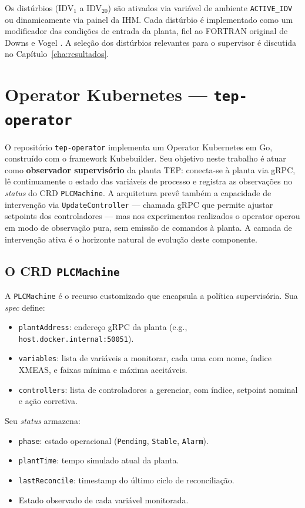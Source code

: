 Os distúrbios (IDV$_1$ a IDV$_{20}$) são ativados via variável de ambiente \texttt{ACTIVE\_IDV} ou dinamicamente via painel da IHM. Cada distúrbio é implementado como um modificador das condições de entrada da planta, fiel ao FORTRAN original de Downs e Vogel \cite{DOWNS1993}. A seleção dos distúrbios relevantes para o supervisor é discutida no Capítulo~\ref{cha:resultados}.

\section{Operator Kubernetes — \texttt{tep-operator}}
\label{sec:operator}

O repositório \texttt{tep-operator} implementa um Operator Kubernetes em Go, construído com o framework Kubebuilder. Seu objetivo neste trabalho é atuar como \textbf{observador supervisório} da planta TEP: conecta-se à planta via gRPC, lê continuamente o estado das variáveis de processo e registra as observações no \textit{status} do CRD \texttt{PLCMachine}. A arquitetura prevê também a capacidade de intervenção via \texttt{UpdateController} — chamada gRPC que permite ajustar setpoints dos controladores — mas nos experimentos realizados o operator operou em modo de observação pura, sem emissão de comandos à planta. A camada de intervenção ativa é o horizonte natural de evolução deste componente.

\subsection{O CRD \texttt{PLCMachine}}

A \texttt{PLCMachine} é o recurso customizado que encapsula a política supervisória. Sua \textit{spec} define:

\begin{itemize}
  \item \texttt{plantAddress}: endereço gRPC da planta (e.g., \texttt{host.docker.internal:50051}).
  \item \texttt{variables}: lista de variáveis a monitorar, cada uma com nome, índice XMEAS, e faixas mínima e máxima aceitáveis.
  \item \texttt{controllers}: lista de controladores a gerenciar, com índice, setpoint nominal e ação corretiva.
\end{itemize}

Seu \textit{status} armazena:

\begin{itemize}
  \item \texttt{phase}: estado operacional (\texttt{Pending}, \texttt{Stable}, \texttt{Alarm}).
  \item \texttt{plantTime}: tempo simulado atual da planta.
  \item \texttt{lastReconcile}: timestamp do último ciclo de reconciliação.
  \item Estado observado de cada variável monitorada.
\end{itemize}

